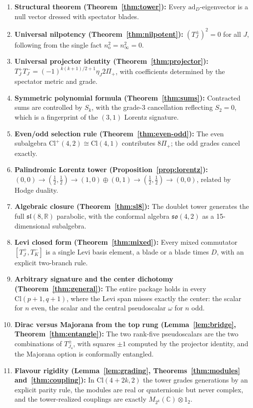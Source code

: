 \documentclass{birkjour}
\theoremstyle{definition}
\theoremstyle{remark}
\numberwithin{equation}{section}
\newcommand{\Cl}{\mathrm{Cl}}
\newcommand{\so}{\mathfrak{so}}
\newcommand{\slR}{\mathfrak{sl}}
\newcommand{\no}{n_{\mathrm{o}}}
\newcommand{\ninf}{n_{\infty}}
\newcommand{\R}{\mathbb{R}}
\newcommand{\C}{\mathbb{C}}
\newcommand{\ad}{\mathrm{ad}}
\providecommand{\rev}{{}}
\begin{document}
\begin{enumerate}[label=(\roman*)]
\item \textbf{Structural theorem
(Theorem~\ref{thm:tower}):}
Every $\ad_D$-eigenvector is a null vector
dressed with spectator blades.

\item \textbf{Universal nilpotency
(Theorem~\ref{thm:nilpotent}):}
$(T^\pm_J)^2=0$ for all $J$, following from the single
fact $\no^2=\ninf^2=0$.

\item \textbf{Universal projector identity
(Theorem~\ref{thm:projector}):}
$T^+_J T^-_J=(-1)^{k(k+1)/2+1}\eta_J 2\Pi_+$,
with coefficients determined by the spectator metric
and grade.

\item \textbf{Symmetric polynomial formula
(Theorem~\ref{thm:sums}):}
Contracted sums are controlled by $S_k$, with the
grade-3 cancellation reflecting $S_2=0$, which is a fingerprint
of the $(3,1)$ Lorentz signature.

\item \textbf{Even/odd selection rule
(Theorem~\ref{thm:even-odd}):}
The even subalgebra $\Cl^+(4,2)\cong\Cl(4,1)$
contributes $8\Pi_+$; the odd grades cancel exactly.

\item \textbf{Palindromic Lorentz tower
(Proposition~\ref{prop:lorentz}):}
$(0,0)\to(\tfrac12,\tfrac12)\to
(1,0)\oplus(0,1)\to(\tfrac12,\tfrac12)\to(0,0)$,
related by Hodge duality.

\item \textbf{Algebraic closure
(Theorem~\ref{thm:sl8}):}
The doublet tower generates the full $\slR(8,\R)$
parabolic, with the conformal algebra $\so(4,2)$ as a
15-dimensional subalgebra.

\item \rev{\textbf{Levi closed form
(Theorem~\ref{thm:mixed}):}
Every mixed commutator $[T^+_J,T^-_K]$ is a single Levi
basis element, a blade or a blade times $D$, with an
explicit two-branch rule.}

\item \rev{\textbf{Arbitrary signature and the center
dichotomy (Theorem~\ref{thm:general}):}
The entire package holds in every $\Cl(p+1,q+1)$, where
the Levi span misses exactly the center: the scalar for
$n$ even, the scalar and the central pseudoscalar $\omega$
for $n$ odd.}

\item \rev{\textbf{Dirac versus Majorana from the top rung
(Lemma~\ref{lem:bridge}, Theorem~\ref{thm:entangle}):}
The two rank-five pseudoscalars are the two combinations
of $T^\pm_{J_4}$, with squares $\pm1$ computed by the
projector identity, and the Majorana option is conformally
entangled.}

\item \rev{\textbf{Flavour rigidity
(Lemma~\ref{lem:grading}, Theorems~\ref{thm:modules}
and~\ref{thm:coupling}):}
In $\Cl(4+2k,2)$ the tower grades generations by an
explicit parity rule, the modules are real or quaternionic
but never complex, and the tower-realized couplings are
exactly $M_{2^k}(\C)\otimes1_2$.}
\end{enumerate}
\end{document}
